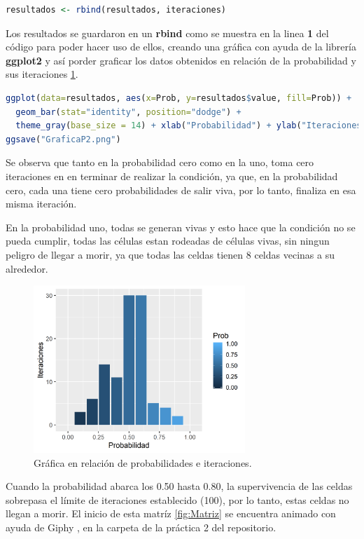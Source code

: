 \documentclass{article}
\begin{document}
\begin{lstlisting}[language=R]
resultados <- rbind(resultados, iteraciones)
\end{lstlisting}

Los resultados se guardaron en un \textbf{rbind} como se muestra en la linea \textbf{1} del c\'odigo para poder hacer uso de ellos, creando una gr\'afica con ayuda de la librer\'ia \textbf{ggplot2} y as\'i porder graficar los datos obtenidos en relaci\'on de la probabilidad y sus iteraciones \ref{fig:Grafica}.

\begin{lstlisting}[language=R]
ggplot(data=resultados, aes(x=Prob, y=resultados$value, fill=Prob)) + 
  geom_bar(stat="identity", position="dodge") +
  theme_gray(base_size = 14) + xlab("Probabilidad") + ylab("Iteraciones") 
ggsave("GraficaP2.png")
\end{lstlisting}

Se observa que tanto en la probabilidad cero como en la uno, toma cero iteraciones en en terminar de realizar la condici\'on, ya que, en la probabilidad cero, cada una tiene cero probabilidades de salir viva, por lo tanto, finaliza en esa misma iteraci\'on. 

En la probabilidad uno, todas se generan vivas y esto hace que la condici\'on no se pueda cumplir, todas las c\'elulas estan rodeadas de c\'elulas vivas, sin ningun peligro de llegar a morir, ya que todas las celdas tienen 8 celdas vecinas a su alrededor.

\begin{figure}[h!]
\centering\includegraphics[width=80mm]{GraficaP2.png}
\caption{Gr\'afica en relaci\'on de probabilidades e iteraciones.}
\label{fig:Grafica}
\end{figure}

Cuando la probabilidad abarca los 0.50 hasta 0.80, la supervivencia de las celdas sobrepasa el l\'imite de iteraciones establecido (100), por lo tanto, estas celdas no llegan a morir.
El inicio de esta matr\'iz \ref{fig:Matriz} se encuentra animado con ayuda de Giphy \cite{Giphy}, en la carpeta de la pr\'actica 2 del repositorio.
\end{document}
